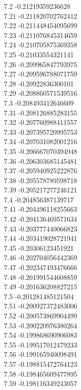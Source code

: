 {7.2	-0.21219359236628\\
7.21	-0.211820702762412\\
7.22	-0.211448454095699\\
7.23	-0.211076845314659\\
7.24	-0.210705875369358\\
7.25	-0.21033554321141\\
7.26	-0.209965847793975\\
7.27	-0.209596788071759\\
7.28	-0.20922836300101\\
7.29	-0.208860571539516\\
7.3	-0.208493412646609\\
7.31	-0.208126885283155\\
7.32	-0.207760988411557\\
7.33	-0.207395720995753\\
7.34	-0.207031082001216\\
7.35	-0.206667070394948\\
7.36	-0.206303685145481\\
7.37	-0.205940925222876\\
7.38	-0.205578789598718\\
7.39	-0.205217277246121\\
7.4	-0.204856387139717\\
7.41	-0.204496118255663\\
7.42	-0.204136469571634\\
7.43	-0.203777440066823\\
7.44	-0.203419028721941\\
7.45	-0.20306123451921\\
7.46	-0.202704056442369\\
7.47	-0.202347493476666\\
7.48	-0.201991544608859\\
7.49	-0.201636208827215\\
7.5	-0.201281485121504\\
7.51	-0.200927372483006\\
7.52	-0.200573869904499\\
7.53	-0.200220976380264\\
7.54	-0.199868690906083\\
7.55	-0.199517012479233\\
7.56	-0.199165940098491\\
7.57	-0.198815472764123\\
7.58	-0.198465609477895\\
7.59	-0.198116349243057\\
}
